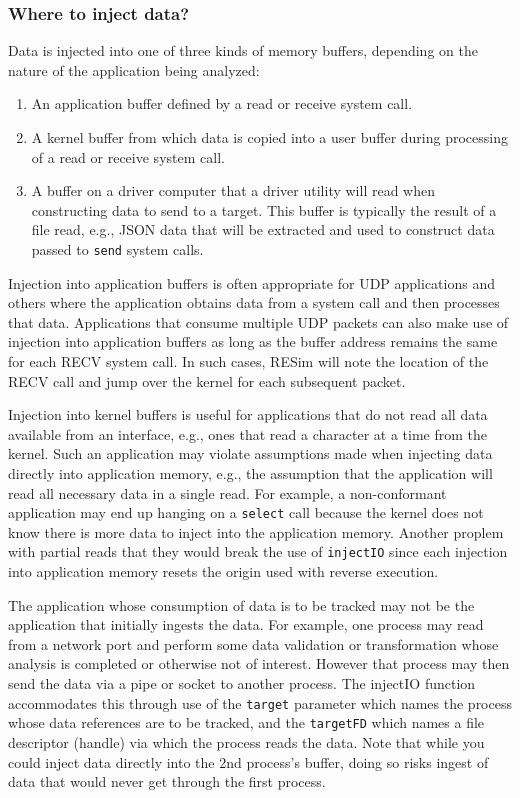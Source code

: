 \documentclass[titlepage]{article}
\begin{document}
\subsubsection{Where to inject data?}
\label{where-to-inject}
Data is injected into one of three kinds of memory buffers, depending on the nature of the application being analyzed:
\begin{enumerate}
\item An application buffer defined by a read or receive system call.
\item A kernel buffer from which data is copied into a user buffer during processing of a read or receive system call.
\item A buffer on a driver computer that a driver utility will read when constructing data to send to a target.
This buffer is typically the result of a file read, e.g., JSON data that will be extracted and used to construct 
data passed to {\tt send} system calls.
\end{enumerate}

Injection into application buffers is often appropriate for UDP applications and others where the application obtains data from a system 
call and then processes that data.  Applications that consume multiple UDP packets can also make use of injection into application buffers
as long as the buffer address remains the same for each RECV system call.  In such cases, RESim will note the location of the RECV call
and jump over the kernel for each subsequent packet.
 
Injection into kernel buffers is useful for applications that do not read all data available from an interface, e.g., ones that read a character at a time from the kernel.  
Such an application may violate assumptions made when injecting data directly into application memory, e.g., the assumption that the application
will read all necessary data in a single read.  For example, a non-conformant application may end up hanging on a {\tt select} call because
the kernel does not know there is more data to inject into the application memory.  Another proplem with partial reads that they would break
the use of {\tt injectIO} since each injection into application memory resets the origin used with reverse execution.

The application whose consumption of data is to be tracked may not be the application that initially ingests the data.  For example, one
process may read from a network port and perform some data validation or transformation whose analysis is completed or otherwise not of interest.
However that process may then send the data via a pipe or socket to another process.  The injectIO function accommodates this through use of
the {\tt target} parameter which names the process whose data references are to be tracked, and the {\tt targetFD} which names 
a file descriptor (handle) via which
the process reads the data.  Note that while you could inject data directly into the 2nd process's buffer, doing so risks ingest of data that
would never get through the first process.
\end{document}
